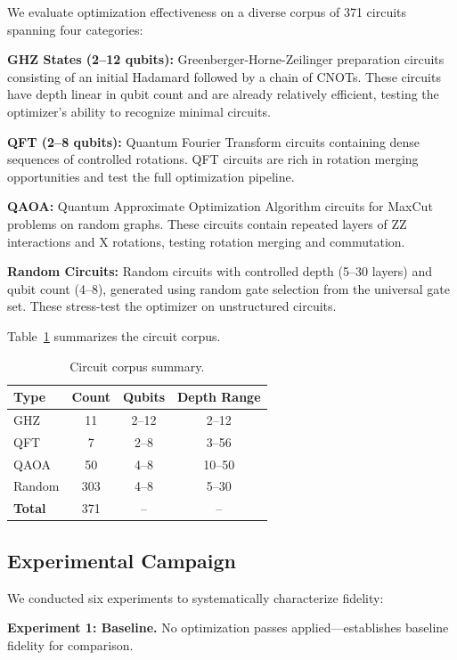 \documentclass[journal]{IEEEtran}
\begin{document}
We evaluate optimization effectiveness on a diverse corpus of 371 circuits spanning four categories:

\textbf{GHZ States (2--12 qubits):} Greenberger-Horne-Zeilinger preparation circuits consisting of an initial Hadamard followed by a chain of CNOTs. These circuits have depth linear in qubit count and are already relatively efficient, testing the optimizer's ability to recognize minimal circuits.

\textbf{QFT (2--8 qubits):} Quantum Fourier Transform circuits containing dense sequences of controlled rotations. QFT circuits are rich in rotation merging opportunities and test the full optimization pipeline.

\textbf{QAOA:} Quantum Approximate Optimization Algorithm circuits for MaxCut problems on random graphs. These circuits contain repeated layers of ZZ interactions and X rotations, testing rotation merging and commutation.

\textbf{Random Circuits:} Random circuits with controlled depth (5--30 layers) and qubit count (4--8), generated using random gate selection from the universal gate set. These stress-test the optimizer on unstructured circuits.

Table~\ref{tab:corpus} summarizes the circuit corpus.

\begin{table}[t]
\caption{Circuit corpus summary.}
\label{tab:corpus}
\centering
\begin{tabular}{lccc}
\hline
Type & Count & Qubits & Depth Range \\
\hline
GHZ & 11 & 2--12 & 2--12 \\
QFT & 7 & 2--8 & 3--56 \\
QAOA & 50 & 4--8 & 10--50 \\
Random & 303 & 4--8 & 5--30 \\
\hline
\textbf{Total} & 371 & -- & -- \\
\hline
\end{tabular}
\end{table}

\subsection{Experimental Campaign}

We conducted six experiments to systematically characterize fidelity:

\textbf{Experiment 1: Baseline.} No optimization passes applied---establishes baseline fidelity for comparison.
\end{document}
